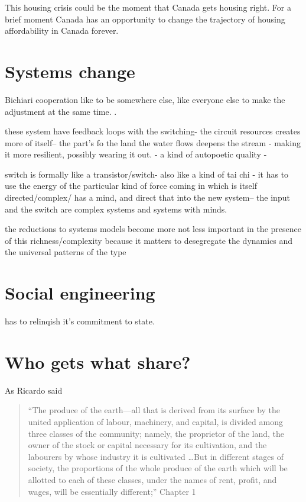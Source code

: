 This housing crisis could be the moment that Canada gets housing right. For a brief moment Canada has an opportunity to change the trajectory of housing affordability in Canada forever.


\section{Systems change}


Bichiari cooperation
like to be somewhere else, like everyone else to make the adjustment at the same time. .

these system have feedback loops with the switching- the circuit resources creates more of itself-- the part's fo the land the water flows deepens the stream - making it more resilient, possibly wearing it out. - a kind of autopoetic quality -

switch is formally like a transistor/switch- also like a kind of tai chi - it has to use the energy of the particular kind of force coming in which is itself directed/complex/ has a mind, and direct that into the new system-- the input and the switch are complex systems and systems with minds.


the reductions to systems models become more not less important in the presence of this richness/complexity because it matters to desegregate the dynamics and the universal patterns of the type


\section{Social engineering}

has to relinqish it's commitment to state. 


\section{Who gets what share?}

As Ricardo said
\begin{quotation}   
 ``The produce of the earth---all that is derived from its surface by the united application of labour, machinery, and capital, is divided among three classes of the community; namely, the proprietor of the land, the owner of the stock or capital necessary for its cultivation, and the labourers by whose industry it is cultivated \dots But in different stages of society, the proportions of the whole produce of the earth which will be allotted to each of these classes, under the names of rent, profit, and wages, will be essentially different;''  Chapter 1
\end{quotation}

